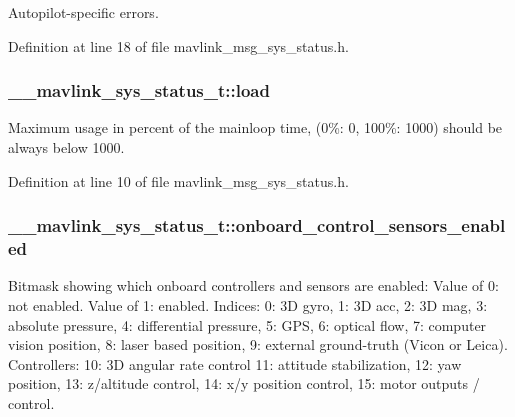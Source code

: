 Autopilot-\/specific errors. 



Definition at line 18 of file mavlink\-\_\-msg\-\_\-sys\-\_\-status.\-h.

\hypertarget{struct____mavlink__sys__status__t_a2c25af241ac32995f2194d53dcaaf3e2}{
\subsubsection[{load}]{ \-\_\-\-\_\-mavlink\-\_\-sys\-\_\-status\-\_\-t\-::load}}\label{struct____mavlink__sys__status__t_a2c25af241ac32995f2194d53dcaaf3e2}


Maximum usage in percent of the mainloop time, (0\%\-: 0, 100\%\-: 1000) should be always below 1000. 



Definition at line 10 of file mavlink\-\_\-msg\-\_\-sys\-\_\-status.\-h.

\hypertarget{struct____mavlink__sys__status__t_ac7217643b5de2bd8fe861b0c9ff7277c}{
\subsubsection[{onboard\-\_\-control\-\_\-sensors\-\_\-enabled}]{ \-\_\-\-\_\-mavlink\-\_\-sys\-\_\-status\-\_\-t\-::onboard\-\_\-control\-\_\-sensors\-\_\-enabled}}\label{struct____mavlink__sys__status__t_ac7217643b5de2bd8fe861b0c9ff7277c}


Bitmask showing which onboard controllers and sensors are enabled\-: Value of 0\-: not enabled. Value of 1\-: enabled. Indices\-: 0\-: 3\-D gyro, 1\-: 3\-D acc, 2\-: 3\-D mag, 3\-: absolute pressure, 4\-: differential pressure, 5\-: G\-P\-S, 6\-: optical flow, 7\-: computer vision position, 8\-: laser based position, 9\-: external ground-\/truth (Vicon or Leica). Controllers\-: 10\-: 3\-D angular rate control 11\-: attitude stabilization, 12\-: yaw position, 13\-: z/altitude control, 14\-: x/y position control, 15\-: motor outputs / control. 



